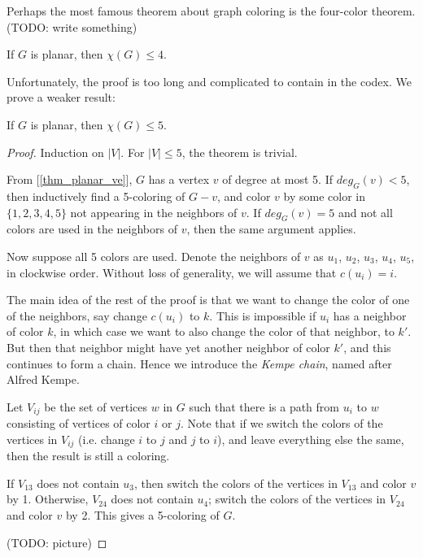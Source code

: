         Perhaps the most famous theorem about graph coloring is the four-color theorem. (TODO: write something) 
        
        \begin{thm} \label{thm_four_color}
            If $G$ is planar, then $\chi(G) \leq 4$.
        \end{thm}
        
        Unfortunately, the proof is too long and complicated to contain in the codex. We prove a weaker result:
        
        \begin{thm} \label{thm_five_color}
            If $G$ is planar, then $\chi(G) \leq 5$.
        \end{thm}
        
        \begin{proof}
            Induction on $|V|$. For $|V| \leq 5$, the theorem is trivial.
            
            From [\ref{thm_planar_ve}], $G$ has a vertex $v$ of degree at most 5. If $deg_G(v) < 5$, then inductively find a 5-coloring of $G-v$, and color $v$ by some color in $\{1,2,3,4,5\}$ not appearing in the neighbors of $v$. If $deg_G(v) = 5$ and not all colors are used in the neighbors of $v$, then the same argument applies.
            
            Now suppose all 5 colors are used. Denote the neighbors of $v$ as $u_1$, $u_2$, $u_3$, $u_4$, $u_5$, in clockwise order. Without loss of generality, we will assume that $c(u_i)=i$.
            
            The main idea of the rest of the proof is that we want to change the color of one of the neighbors, say change $c(u_i)$ to $k$. This is impossible if $u_i$ has a neighbor of color $k$, in which case we want to also change the color of that neighbor, to $k'$. But then that neighbor might have yet another neighbor of color $k'$, and this continues to form a chain. Hence we introduce the \emph{Kempe chain}, named after Alfred Kempe.
            
            Let $V_{ij}$ be the set of vertices $w$ in $G$ such that there is a path from $u_i$ to $w$ consisting of vertices of color $i$ or $j$. Note that if we switch the colors of the vertices in $V_{ij}$ (i.e. change $i$ to $j$ and $j$ to $i$), and leave everything else the same, then the result is still a coloring.
            
            If $V_{13}$ does not contain $u_3$, then switch the colors of the vertices in $V_{13}$ and color $v$ by 1. Otherwise, $V_{24}$ does not contain $u_4$; switch the colors of the vertices in $V_{24}$ and color $v$ by 2. This gives a 5-coloring of $G$.
            
            (TODO: picture)
        \end{proof}
        
